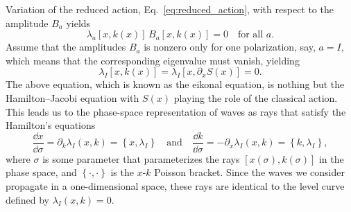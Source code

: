 Variation of the reduced action, Eq.~\eqref{eq:reduced_action}, with respect to the amplitude $B_{a}$ yields
%
\begin{equation}
  \lambda_{a}[x, k(x)]\,B_{a}[x, k(x)] = 0
  \quad\text{for all $a$}.
\end{equation}
%
Assume that the amplitudes $B_{a}$ is nonzero only for one polarization, say, $a = I$, which means that the corresponding eigenvalue must vanish, yielding
%
\begin{equation}
  \lambda_{I}\left[x, k(x)\right] = \lambda_{I}\left[x, \partial_{x}S(x)\right] = 0.
  \label{eq:eikonal}
\end{equation}
%
The above equation, which is known as the eikonal equation, is nothing but the Hamilton--Jacobi equation with $S(x)$ playing the role of the classical action.
 This leads us to the phase-space representation of waves as rays that satisfy the Hamilton's equations
%
\begin{equation}
  \frac{\dd{x}}{\dd{\sigma}} = \partial_{k}\lambda_{I}(x, k) = \left\{x, \lambda_{I}\right\}
  \quad\text{and}\quad
  \frac{\dd{k}}{\dd{\sigma}} = -\partial_{x}\lambda_{I}(x, k) = \left\{k, \lambda_{I}\right\},
\end{equation}
%
where $\sigma$ is some parameter that parameterizes the rays $[x(\sigma), k(\sigma)]$ in the phase space, and $\left\{\cdot, \cdot\right\}$ is the $x$-$k$ Poisson bracket.
Since the waves we consider propagate in a one-dimensional space, these rays are identical to the level curve defined by $\lambda_{I}(x, k) = 0$.

